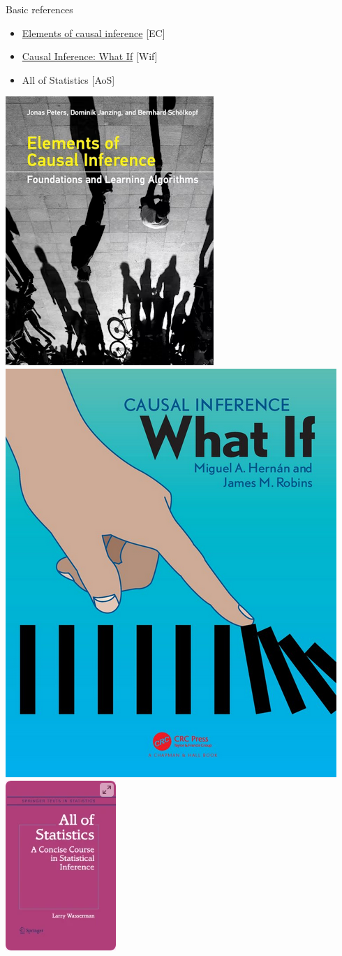 \documentclass{beamer}
\begin{document}
\begin{frame}{Basic references}
  \begin{itemize}
    \item \href{https://mitpress.mit.edu/9780262037310/elements-of-causal-inference/}{Elements of causal inference} \citep{peters2017elements} [EC] 
    \item \href{https://miguelhernan.org/whatifbook}{Causal Inference: What If} \citep{hernan2025causal} [Wif]
    \item All of Statistics \citep{wasserman2013all} [AoS] 
  \end{itemize}

  \includegraphics[width = 2 cm]{elements}
  \includegraphics[width = 2 cm]{whatif}
  \includegraphics[width = 2 cm]{all}
\end{frame}
\end{document}
